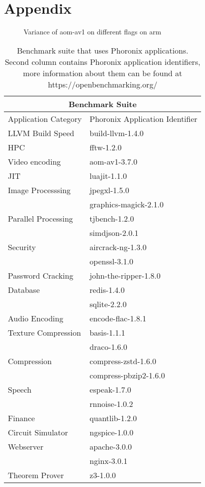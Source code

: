 \section{Appendix} \label{sec:appendix}

\begin{figure}[H]
  \centering
  
  \caption{Variance of aom-av1 on different flags on arm}
  \label{fig:EncoderModeSpeed6TwoPassInputBosphorus4K}
\end{figure}

\begin{table}[H]
\centering
\begin{tabular}{ |p{5cm}|p{5cm}|  }
 \hline
 \multicolumn{2}{|c|}{Benchmark Suite} \\
 \hline
 Application Category & Phoronix Application Identifier\\
 \hline
 \hline
 LLVM Build Speed   & build-llvm-1.4.0    \\
 \hline
 HPC & fftw-1.2.0    \\
 \hline
 Video encoding   & aom-av1-3.7.0    \\
 \hline
 JIT & luajit-1.1.0 \\
 \hline
 Image Processsing & jpegxl-1.5.0 \\
 & graphics-magick-2.1.0 \\
 \hline
 Parallel Processing & tjbench-1.2.0 \\
 & simdjson-2.0.1 \\
 \hline
 Security & aircrack-ng-1.3.0 \\
 & openssl-3.1.0 \\
 \hline
 Password Cracking & john-the-ripper-1.8.0 \\
 \hline
 Database & redis-1.4.0 \\ 
 & sqlite-2.2.0 \\
 \hline
 Audio Encoding & encode-flac-1.8.1 \\
 \hline
 Texture Compression & basis-1.1.1 \\
 & draco-1.6.0 \\
 \hline
 Compression & compress-zstd-1.6.0 \\
 & compress-pbzip2-1.6.0 \\
 \hline
 Speech & espeak-1.7.0 \\
 & rnnoise-1.0.2 \\
 \hline
 Finance & quantlib-1.2.0 \\
 \hline
 Circuit Simulator & ngspice-1.0.0 \\
 \hline
 Webserver & apache-3.0.0 \\
 & nginx-3.0.1 \\
 \hline
 Theorem Prover & z3-1.0.0 \\
 \hline
\end{tabular}
\caption{\label{tab:suite} Benchmark suite that uses Phoronix
applications. Second column contains Phoronix application identifiers, more
information about them can be found at https://openbenchmarking.org/}
\end{table}

